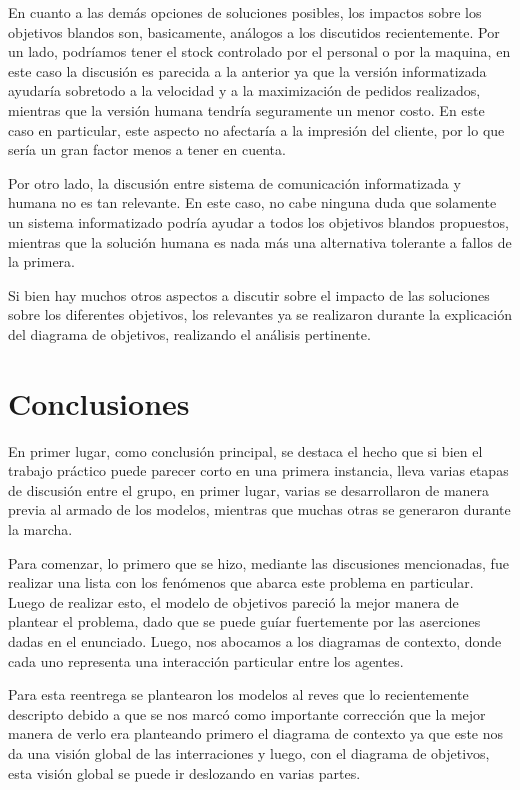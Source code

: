 \documentclass[a4paper,10pt]{article}
\begin{document}
\medskip

En cuanto a las dem\'as opciones de soluciones posibles, los impactos sobre los objetivos blandos son, basicamente, an\'alogos a los discutidos
recientemente. Por un lado, podr\'iamos tener el stock controlado por el personal o por la maquina, en este caso la discusi\'on es parecida a la anterior
ya que la versi\'on informatizada ayudar\'ia sobretodo a la velocidad y a la maximizaci\'on de pedidos realizados, mientras que la versi\'on humana
tendr\'ia seguramente un menor costo. En este caso en particular, este aspecto no afectar\'ia a la impresi\'on del cliente, por lo que ser\'ia un
gran factor menos a tener en cuenta.

Por otro lado, la discusi\'on entre sistema de comunicaci\'on informatizada y humana no es tan relevante. En este caso, no cabe ninguna duda que 
solamente un sistema informatizado podr\'ia ayudar a todos los objetivos blandos propuestos, mientras que la soluci\'on humana es nada m\'as una alternativa
tolerante a fallos de la primera.
\medskip

Si bien hay muchos otros aspectos a discutir sobre el impacto de las soluciones sobre los diferentes objetivos, los relevantes ya se realizaron
durante la explicaci\'on del diagrama de objetivos, realizando el an\'alisis pertinente.
 

\newpage
\section*{Conclusiones}

En primer lugar, como conclusi\'on principal, se destaca el hecho que si bien el trabajo pr\'actico puede parecer corto en una primera instancia,
lleva varias etapas de discusi\'on entre el grupo, en primer lugar, varias se desarrollaron de manera previa al armado de los modelos, mientras
que muchas otras se generaron durante la marcha.

Para comenzar, lo primero que se hizo, mediante las discusiones mencionadas, fue realizar una lista con los fen\'omenos que abarca este problema
en particular. Luego de realizar esto, el modelo de objetivos pareci\'o la mejor manera de plantear el problema, dado que se puede gu\'iar
fuertemente por las aserciones dadas en el enunciado. Luego, nos abocamos a los diagramas de contexto, donde cada uno representa una interacci\'on
particular entre los agentes.

Para esta reentrega se plantearon los modelos al reves que lo recientemente descripto debido a que se nos marc\'o como importante correcci\'on que la mejor manera de verlo era planteando primero el diagrama de contexto ya que este nos da una visi\'on global de las interraciones y luego, con el diagrama de objetivos, esta visi\'on global se puede ir deslozando en varias partes.
\end{document}
